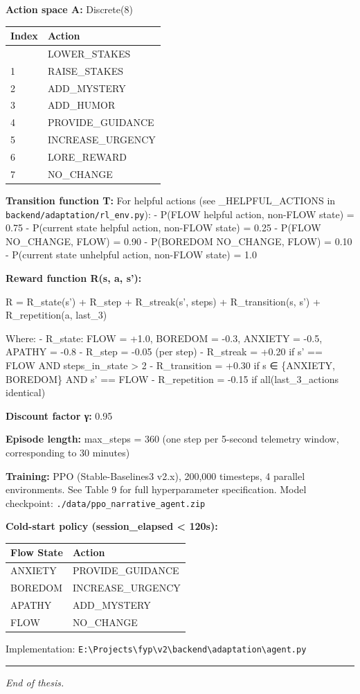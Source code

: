 \textbf{Action space A:} Discrete(8)

\begin{longtable}[]{@{}ll@{}}
\toprule\noalign{}
Index & Action \\
\midrule\noalign{}
\endhead
\bottomrule\noalign{}
\endlastfoot
0 & LOWER\_STAKES \\
1 & RAISE\_STAKES \\
2 & ADD\_MYSTERY \\
3 & ADD\_HUMOR \\
4 & PROVIDE\_GUIDANCE \\
5 & INCREASE\_URGENCY \\
6 & LORE\_REWARD \\
7 & NO\_CHANGE \\
\end{longtable}

\textbf{Transition function T:} For helpful actions (see
\_HELPFUL\_ACTIONS in \texttt{backend/adaptation/rl\_env.py}): - P(FLOW
\textbar{} helpful action, non-FLOW state) = 0.75 - P(current state
\textbar{} helpful action, non-FLOW state) = 0.25 - P(FLOW \textbar{}
NO\_CHANGE, FLOW) = 0.90 - P(BOREDOM \textbar{} NO\_CHANGE, FLOW) = 0.10
- P(current state \textbar{} unhelpful action, non-FLOW state) = 1.0

\textbf{Reward function R(s, a, s'):}

R = R\_state(s') + R\_step + R\_streak(s', steps) + R\_transition(s, s')
+ R\_repetition(a, last\_3)

Where: - R\_state: FLOW = +1.0, BOREDOM = -0.3, ANXIETY = -0.5, APATHY =
-0.8 - R\_step = -0.05 (per step) - R\_streak = +0.20 if s' == FLOW AND
steps\_in\_state \textgreater{} 2 - R\_transition = +0.30 if s ∈
\{ANXIETY, BOREDOM\} AND s' == FLOW - R\_repetition = -0.15 if
all(last\_3\_actions identical)

\textbf{Discount factor γ:} 0.95

\textbf{Episode length:} max\_steps = 360 (one step per 5-second
telemetry window, corresponding to 30 minutes)

\textbf{Training:} PPO (Stable-Baselines3 v2.x), 200,000 timesteps, 4
parallel environments. See Table 9 for full hyperparameter
specification. Model checkpoint:
\texttt{./data/ppo\_narrative\_agent.zip}

\textbf{Cold-start policy (session\_elapsed \textless{} 120s):}

\begin{longtable}[]{@{}ll@{}}
\toprule\noalign{}
Flow State & Action \\
\midrule\noalign{}
\endhead
\bottomrule\noalign{}
\endlastfoot
ANXIETY & PROVIDE\_GUIDANCE \\
BOREDOM & INCREASE\_URGENCY \\
APATHY & ADD\_MYSTERY \\
FLOW & NO\_CHANGE \\
\end{longtable}

Implementation:
\texttt{E:\textbackslash{}Projects\textbackslash{}fyp\textbackslash{}v2\textbackslash{}backend\textbackslash{}adaptation\textbackslash{}agent.py}

\begin{center}\rule{0.5\linewidth}{0.5pt}\end{center}

\emph{End of thesis.}
